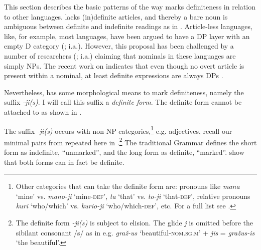 \documentclass[output=paper,
modfonts
]{langscibook}
\begin{document}
This section describes the basic patterns of the way  marks definiteness in relation to other languages. 
 lacks (in)definite articles, and thereby a bare noun is ambiguous between definite and indefinite readings as in . Article-less languages, like, for example, most  languages, have been argued to have a DP layer with an empty D category (\citealt{Rappaport1998,Leko1999,Pereltsvaig2007}; i.a.). However, this proposal has been challenged by a number of researchers (\citealt{Boskovic2009,Boskovic2012,BoskovicGajewski2011,Despic2011}; i.a.) claiming that nominals in these languages are simply NPs. The recent work on  indicates that even though no overt article is present within a nominal, at least definite expressions are always DPs \citep{GillonArmoskaite2015}. \newpage

\begin{exe}
\end{exe}

Nevertheless,  has some morphological means to mark definiteness, namely the suffix \textit{-ji(s)}. I will call this suffix a \textit{definite form}. The definite form cannot be attached to  as shown in . 

\begin{exe}
\end{exe}

The suffix \textit{-ji(s)} occurs with non-NP categories,\footnote{Other categories that can take the definite form are: pronouns like \textit{mana} `mine' vs. \textit{mano-ji} `mine-\textsc{def}', 
 \textit{ta}  `that' vs. \textit{to-ji} `that-\textsc{def}', relative pronouns \textit{kuri} `who/which' vs. \textit{kurio-ji} `who/which-\textsc{def}', etc. For a full list see \citet[223--224]{Stolz2008}.} e.g. adjectives, recall our minimal pairs from  repeated here in .\footnote{The definite form \textit{-ji(s)} is subject to elision. The glide \textit{j} is omitted before the sibilant consonant  /s/ as in e.g. \textit{graž-us} `beautiful-\textsc{nom.sg.m}' + \textit{jis} = \textit{gražus-is} `the beautiful'.} The traditional  Grammar \citep[142]{Ambrazas1997} defines the short form as indefinite, ``unmarked'', and the long form as definite, ``marked''. \citet{GillonArmoskaite2015} show that both forms can in fact be definite.
\end{document}

